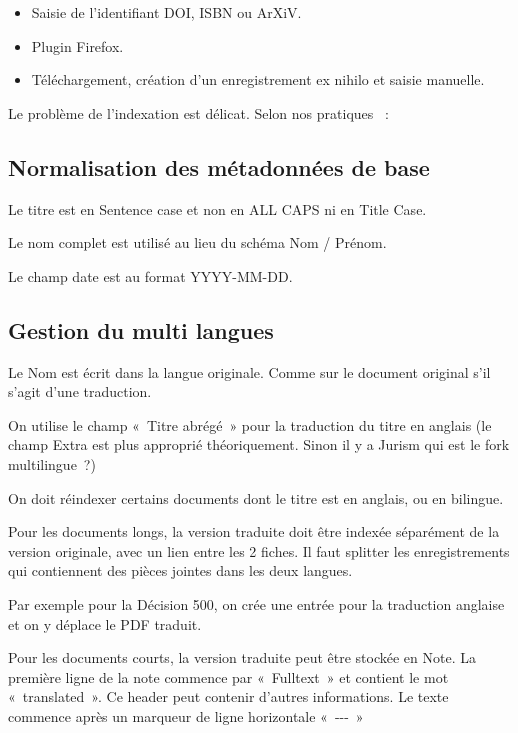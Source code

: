\documentclass[a4paper,11pt]{report}
\providecommand{\tightlist}{\setlength{\itemsep}{0pt}\setlength{\parskip}{0pt}}
\begin{document}
\begin{itemize}
\tightlist
\item
  Saisie de l'identifiant DOI, ISBN ou ArXiV.
\item
  Plugin Firefox.
\item
  Téléchargement, création d'un enregistrement ex nihilo et saisie manuelle.
\end{itemize}

Le problème de l'indexation est délicat. Selon nos pratiques \citep{9666795Z}~:

\subsection{Normalisation des métadonnées de base}\label{normalisation-des-muxe9tadonnuxe9es-de-base}

Le titre est en Sentence case et non en ALL CAPS ni en Title Case.

Le nom complet est utilisé au lieu du schéma Nom / Prénom.

Le champ date est au format YYYY-MM-DD.

\subsection{Gestion du multi langues}\label{gestion-du-multi-langues}

Le Nom est écrit dans la langue originale. Comme sur le document original s'il s'agit d'une traduction.

On utilise le champ «~Titre abrégé~» pour la traduction du titre en anglais (le champ Extra est plus approprié théoriquement. Sinon il y a Jurism qui est le fork multilingue~?)

On doit réindexer certains documents dont le titre est en anglais, ou en bilingue.

Pour les documents longs, la version traduite doit être indexée séparément de la version originale, avec un lien entre les 2 fiches. Il faut splitter les enregistrements qui contiennent des pièces jointes dans les deux langues.

Par exemple pour la Décision 500, on crée une entrée pour la traduction anglaise et on y déplace le PDF traduit.

Pour les documents courts, la version traduite peut être stockée en Note. La première ligne de la note commence par «~Fulltext~» et contient le mot «~translated~». Ce header peut contenir d'autres informations. Le texte commence après un marqueur de ligne horizontale «~-\/-\/-~»
\end{document}
